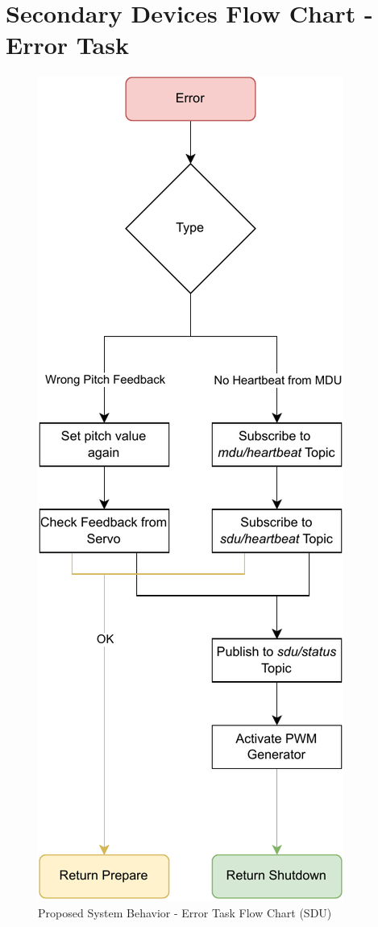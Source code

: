 
\chapter{Secondary Devices Flow Chart - Error Task} %

\label{AppendixC}

\begin{figure}[H]
    \centering
    \includegraphics[scale=0.75]{appendices/assets/SDU_ERROR.pdf}
    \caption{Proposed System Behavior - Error Task Flow Chart (SDU)}
    \label{fig:SDU_ERROR}
\end{figure}

